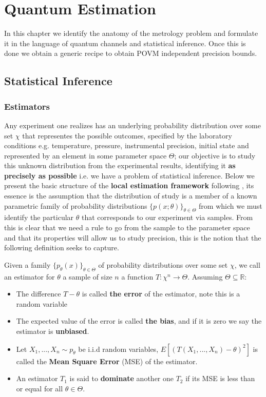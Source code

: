 \chapter{Quantum Estimation}
In this chapter we identify the anatomy of the metrology problem and formulate it
in the language of quantum channels and statistical inference. Once this is done we obtain a generic recipe to obtain POVM independent
precision bounds.
\section{Statistical Inference}
\subsection{Estimators}
Any experiment one realizes has an underlying probability distribution over some set $\chi$ that representes the
possible outcomes, specified by the laboratory conditions e.g. temperature, pressure, instrumental precision, initial state and
represented by an element in some parameter space $\Theta$; our objective
is to study this unknown distribution from the experimental results, identifying it \textbf{as precisely as possible} i.e. we have a problem of
statistical inference. Below we present the basic structure of the \textbf{local estimation framework} following \cite{cover_elements_2006,paris_quantum_2009}, its essence is the assumption that the
distribution of study is a member of a known parametric family of probability distributions $\{p(x;\theta)\}_{\theta \in \Theta}$ from which we
must identify the particular $\theta$ that corresponds to our experiment via samples. From this is clear that we need a rule
to go from the sample to the parameter space and that its properties will allow us to study precision, this is the notion that the following
definition seeks to capture.

\begin{definition}
  Given a family $\{p_{\theta}(x)\}_{\theta \in \Theta}$ of probability distributions over some set $\chi$, we call an estimator for $\theta$ a
  sample of size $n$ a function $T:\chi^{n} \to \Theta$. Assuming $\Theta \subseteq \mathds{R}$:
  \begin{itemize}
  \item The difference $T - \theta$ is called \textbf{the error} of the estimator, note this is a random variable
  \item The expected value of the error is called \textbf{the bias}, and if it is zero we say the estimator is \textbf{unbiased}.
  \item Let  $X_{1}, ..., X_{n} \sim p_{\theta}$ be i.i.d random variables, $E[(T(X_{1}, ..., X_{n})-\theta)^{2}]$ is called the \textbf{Mean Square Error} (MSE) of the estimator.
  \item An estimator $T_{1}$ is said to \textbf{dominate} another one $T_{2}$ if its MSE is less than or equal for all $\theta \in \Theta$.

  \end{itemize}
\end{definition}

